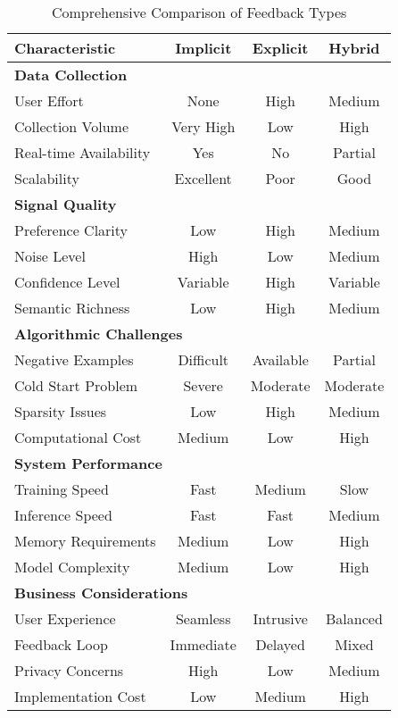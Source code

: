 \begin{table}[ht]
\centering
\caption{Comprehensive Comparison of Feedback Types}
\label{tab:feedback_comparison}
\small
\begin{tabular}{@{}lccc@{}}
\toprule
\textbf{Characteristic} & \textbf{Implicit} & \textbf{Explicit} & \textbf{Hybrid} \\
\midrule
\multicolumn{4}{l}{\textbf{Data Collection}} \\
User Effort & None & High & Medium \\
Collection Volume & Very High & Low & High \\
Real-time Availability & Yes & No & Partial \\
Scalability & Excellent & Poor & Good \\
\midrule
\multicolumn{4}{l}{\textbf{Signal Quality}} \\
Preference Clarity & Low & High & Medium \\
Noise Level & High & Low & Medium \\
Confidence Level & Variable & High & Variable \\
Semantic Richness & Low & High & Medium \\
\midrule
\multicolumn{4}{l}{\textbf{Algorithmic Challenges}} \\
Negative Examples & Difficult & Available & Partial \\
Cold Start Problem & Severe & Moderate & Moderate \\
Sparsity Issues & Low & High & Medium \\
Computational Cost & Medium & Low & High \\
\midrule
\multicolumn{4}{l}{\textbf{System Performance}} \\
Training Speed & Fast & Medium & Slow \\
Inference Speed & Fast & Fast & Medium \\
Memory Requirements & Medium & Low & High \\
Model Complexity & Medium & Low & High \\
\midrule
\multicolumn{4}{l}{\textbf{Business Considerations}} \\
User Experience & Seamless & Intrusive & Balanced \\
Feedback Loop & Immediate & Delayed & Mixed \\
Privacy Concerns & High & Low & Medium \\
Implementation Cost & Low & Medium & High \\
\bottomrule
\end{tabular}
\end{table}

